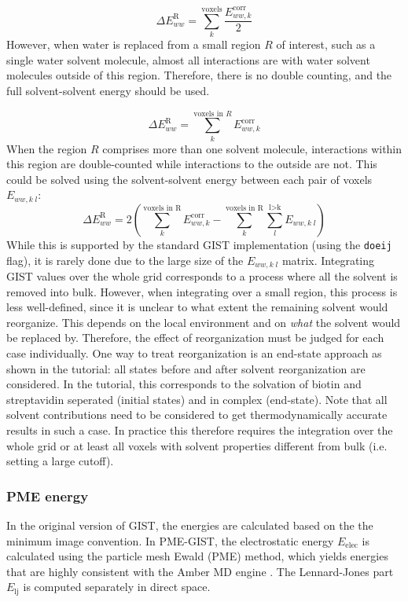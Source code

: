 \documentclass[9pt,tutorial]{livecoms}
\newcommand\inlinecode{\texttt}
\begin{document}
\begin{equation}
	\Delta E^\text{R}_{ww} = \sum_{k}^\text{voxels} \frac{E_{ww,k}^\text{corr}}{2}
\end{equation}
However, when water is replaced from a small region $R$ of interest, such as a single water solvent molecule, almost all interactions are with water solvent molecules outside of this region.
Therefore, there is no double counting, and the full solvent-solvent energy should be used.

\begin{equation}
	\Delta E^\text{R}_{ww} = \sum_{k}^{\text{voxels in }R} E_{ww,k}^\text{corr}
\end{equation}
When the region $R$ comprises more than one solvent molecule, interactions within this region are double-counted while interactions to the outside are not.
This could be solved using the solvent-solvent energy between each pair of voxels $E_{ww,k\;l}$:
\begin{equation}
	\Delta E^\text{R}_{ww} = 2\left(\sum_{k}^\text{voxels in R} E_{ww,k}^\text{corr}-\sum_{k}^\text{voxels in R}\sum_{l}^\text{l>k} E_{ww, k\;l}\right)
\end{equation}
While this is supported by the standard GIST implementation (using the \inlinecode{doeij} flag), it is rarely done due to the large size of the $E_{ww,k\;l}$ matrix.
Integrating GIST values over the whole grid corresponds to a process where all the solvent is removed into bulk.
However, when integrating over a small region, this process is less well-defined, since it is unclear to what extent the remaining solvent would reorganize.
This depends on the local environment and on \emph{what} the solvent would be replaced by.
Therefore, the effect of reorganization must be judged for each case individually.
One way to treat reorganization is an end-state approach as shown in the tutorial: all states before and after solvent reorganization are considered. In the tutorial, this corresponds to the solvation of biotin and streptavidin seperated (initial states) and in complex (end-state). Note that all solvent contributions need to be considered to get thermodynamically accurate results in such a case. In practice this therefore requires the integration over the whole grid or at least all voxels with solvent properties different from bulk (i.e. setting a large cutoff).
\subsubsection{PME energy}
In the original version of GIST, the energies are calculated based on the the minimum image convention.
In PME-GIST, the electrostatic energy $E_\text{elec}$ is calculated using the particle mesh Ewald (PME) method, which yields energies that are highly consistent with the Amber MD engine \cite{Chen2021}.
The Lennard-Jones part $E_\text{lj}$ is computed separately in direct space.
\end{document}
